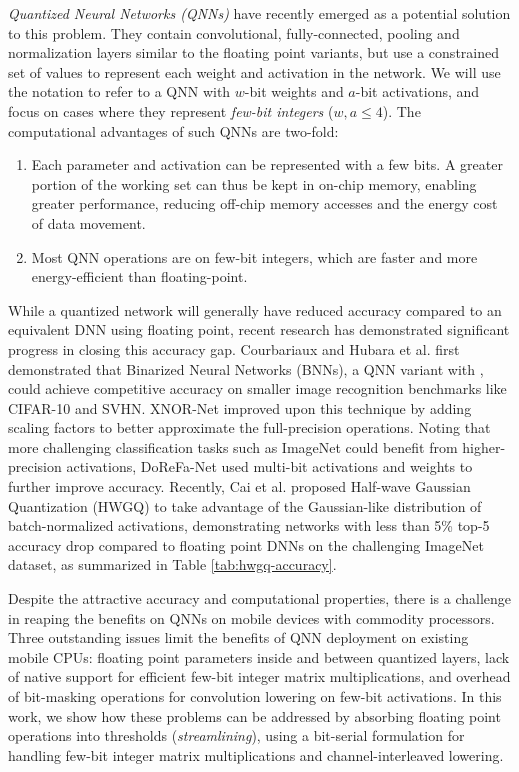 \documentclass[sigconf]{acmart}
\begin{document}
\emph{Quantized Neural Networks (QNNs)} have recently emerged as a potential solution to this problem.
They contain convolutional, fully-connected, pooling and normalization layers similar to the floating point variants, but use a constrained set of values to represent each weight and activation in the network.
We will use the notation  to refer to a QNN with $w$-bit weights and $a$-bit activations, and focus on cases where they represent \emph{few-bit integers} ($w, a \leq 4$).
The computational advantages of such QNNs are two-fold:
\begin{enumerate}
	\item Each parameter and activation can be represented with a few bits.
	A greater portion of the working set can thus be kept in on-chip memory, enabling greater performance, reducing off-chip memory accesses and the energy cost of data movement.
	\item Most QNN operations are on few-bit integers, which are faster and more energy-efficient than floating-point.
\end{enumerate}

While a quantized network will generally have reduced accuracy compared to an equivalent DNN using floating point, recent research has demonstrated significant progress in closing this accuracy gap.
Courbariaux and Hubara et al. \cite{binarynet} first demonstrated that Binarized Neural Networks (BNNs), a QNN variant with , could achieve competitive accuracy on smaller image recognition benchmarks like CIFAR-10 and SVHN.
XNOR-Net \cite{xnornet} improved upon this technique by adding scaling factors to better approximate the full-precision operations.
Noting that more challenging classification tasks such as ImageNet could benefit from higher-precision activations, DoReFa-Net \cite{dorefanet} used multi-bit activations and weights to further improve accuracy.
Recently, Cai et al. \cite{hwgq} proposed Half-wave Gaussian Quantization (HWGQ) to take advantage of the Gaussian-like distribution of batch-normalized activations, demonstrating  networks with less than 5\% top-5 accuracy drop compared to floating point DNNs on the challenging ImageNet dataset, as summarized in Table \ref{tab:hwgq-accuracy}.

Despite the attractive accuracy and computational properties, there is a challenge in reaping the benefits on QNNs on mobile devices with commodity processors.
Three outstanding issues limit the benefits of QNN deployment on existing mobile CPUs: floating point parameters inside and between quantized layers, lack of native support for efficient few-bit integer matrix multiplications, and overhead of bit-masking operations for convolution lowering on few-bit activations.
In this work, we show how these problems can be addressed by absorbing floating point operations into thresholds (\emph{streamlining}), using a bit-serial formulation for handling few-bit integer matrix multiplications and channel-interleaved lowering.
\end{document}
